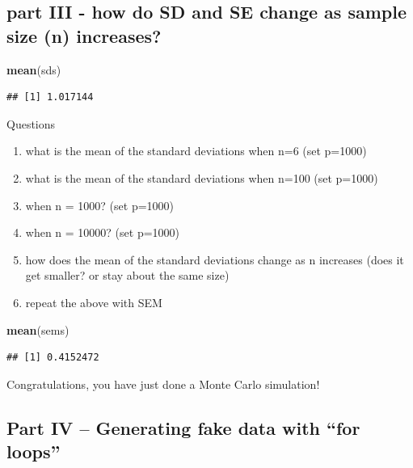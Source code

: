 \documentclass[]{book}
\newenvironment{Shaded}{\begin{snugshade}}{\end{snugshade}}
\newcommand{\KeywordTok}[1]{\textcolor[rgb]{0.13,0.29,0.53}{\textbf{#1}}}
\newcommand{\NormalTok}[1]{#1}
\providecommand{\tightlist}{%
  \setlength{\itemsep}{0pt}\setlength{\parskip}{0pt}}
\begin{document}
\subsection{part III - how do SD and SE change as sample size (n)
increases?}\label{part-iii---how-do-sd-and-se-change-as-sample-size-n-increases}

\begin{Shaded}
\begin{Highlighting}[]
\KeywordTok{mean}\NormalTok{(sds)}
\end{Highlighting}
\end{Shaded}

\begin{verbatim}
## [1] 1.017144
\end{verbatim}

Questions

\begin{enumerate}
\def\labelenumi{\arabic{enumi}.}
\tightlist
\item
  what is the mean of the standard deviations when n=6 (set p=1000)
\item
  what is the mean of the standard deviations when n=100 (set p=1000)
\item
  when n = 1000? (set p=1000)
\item
  when n = 10000? (set p=1000)
\item
  how does the mean of the standard deviations change as n increases
  (does it get smaller? or stay about the same size)
\item
  repeat the above with SEM
\end{enumerate}

\begin{Shaded}
\begin{Highlighting}[]
\KeywordTok{mean}\NormalTok{(sems)}
\end{Highlighting}
\end{Shaded}

\begin{verbatim}
## [1] 0.4152472
\end{verbatim}

Congratulations, you have just done a Monte Carlo simulation!

\subsection{\texorpdfstring{Part IV -- Generating fake data with ``for
loops''}{Part IV -- Generating fake data with for loops}}\label{part-iv-generating-fake-data-with-for-loops}
\end{document}
